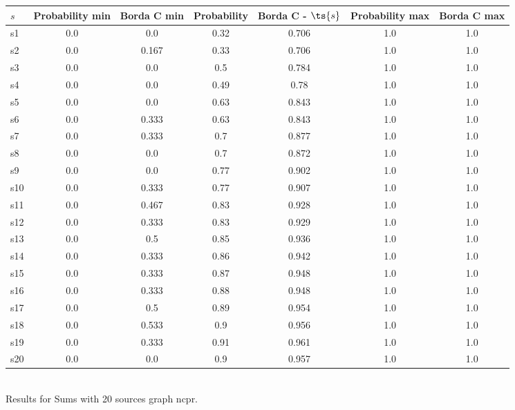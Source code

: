 \documentclass{article}
\begin{document}
\noindent\begin{tabular}{|l|c|c|c|c|c|c|}
\hline
$s$& Probability min & Borda C min & Probability & Borda C - $\ts{s}$ & Probability max & Borda C max\\
\hline
s1 &0.0 & 0.0 & 0.32 & 0.706 & 1.0 & 1.0\\
\hline
s2 &0.0 & 0.167 & 0.33 & 0.706 & 1.0 & 1.0\\
\hline
s3 &0.0 & 0.0 & 0.5 & 0.784 & 1.0 & 1.0\\
\hline
s4 &0.0 & 0.0 & 0.49 & 0.78 & 1.0 & 1.0\\
\hline
s5 &0.0 & 0.0 & 0.63 & 0.843 & 1.0 & 1.0\\
\hline
s6 &0.0 & 0.333 & 0.63 & 0.843 & 1.0 & 1.0\\
\hline
s7 &0.0 & 0.333 & 0.7 & 0.877 & 1.0 & 1.0\\
\hline
s8 &0.0 & 0.0 & 0.7 & 0.872 & 1.0 & 1.0\\
\hline
s9 &0.0 & 0.0 & 0.77 & 0.902 & 1.0 & 1.0\\
\hline
s10 &0.0 & 0.333 & 0.77 & 0.907 & 1.0 & 1.0\\
\hline
s11 &0.0 & 0.467 & 0.83 & 0.928 & 1.0 & 1.0\\
\hline
s12 &0.0 & 0.333 & 0.83 & 0.929 & 1.0 & 1.0\\
\hline
s13 &0.0 & 0.5 & 0.85 & 0.936 & 1.0 & 1.0\\
\hline
s14 &0.0 & 0.333 & 0.86 & 0.942 & 1.0 & 1.0\\
\hline
s15 &0.0 & 0.333 & 0.87 & 0.948 & 1.0 & 1.0\\
\hline
s16 &0.0 & 0.333 & 0.88 & 0.948 & 1.0 & 1.0\\
\hline
s17 &0.0 & 0.5 & 0.89 & 0.954 & 1.0 & 1.0\\
\hline
s18 &0.0 & 0.533 & 0.9 & 0.956 & 1.0 & 1.0\\
\hline
s19 &0.0 & 0.333 & 0.91 & 0.961 & 1.0 & 1.0\\
\hline
s20 &0.0 & 0.0 & 0.9 & 0.957 & 1.0 & 1.0\\
\hline
\end{tabular}\\

\noindent Results for Sums with 20 sources graph ncpr.
\end{document}
